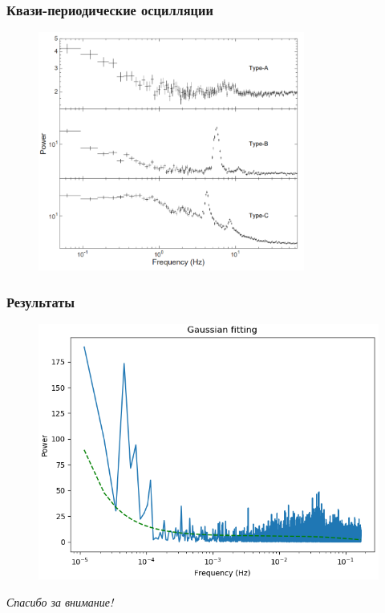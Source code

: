 \documentclass[10pt, pdf, hyperref={unicode}]{beamer}
\begin{document}
	\begin{frame}
	
		\frametitle{Квази-периодические осцилляции}
		
		\begin{figure}
		\centering
		\includegraphics[width = 0.78\textwidth]{QPO}
		\end{figure}
	
	\end{frame}
	
	\begin{frame}
		
		\frametitle{Результаты}
		
		\begin{figure}
		\centering
		\includegraphics[width = 0.8\linewidth]{MAXI_J1820+070_KW_gaussian_approximation_day_41}
		\end{figure}
		
	\end{frame}
	
	\begin{frame}{}
  	\centering \Huge
  	\emph{Спасибо за внимание!}
	\end{frame}

	
\end{document}

